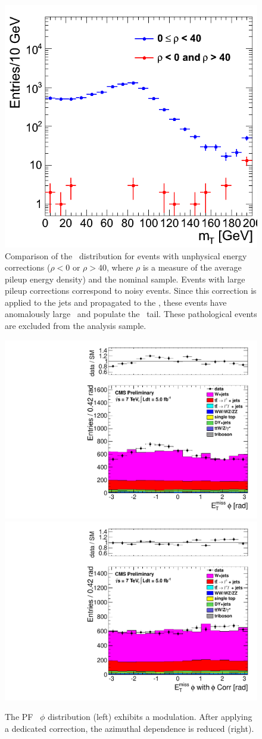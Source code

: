 \begin{figure}[tbh]
  \begin{center}
	\includegraphics[width=0.5\linewidth]{plots/mt_rho_comp.png}
	\caption{ \label{fig:mtrhocomp}%
	  Comparison of the \mt\ distribution for events with
          unphysical energy corrections ($\rho <0$ or $ \rho > 40$, where $\rho$ is a
          measure of the average pileup energy density) and the
          nominal sample. Events with large pileup corrections 
          correspond to noisy events. Since this correction is applied
          to the jets and propagated to the \met, these events have
          anomalously large \met\ and populate the \mt\ tail. These
          pathological events are excluded from the analysis sample.}
  \end{center}
\end{figure}

\begin{figure}[hb]
  \begin{center}
	\includegraphics[width=0.5\linewidth]{plots/metphi.pdf}%
	\includegraphics[width=0.5\linewidth]{plots/metphi_phicorr.pdf}
	\caption{ \label{fig:metphicomp}%
	  The PF \met\ $\phi$ distribution (left) exhibits a
          modulation. After applying a dedicated correction, the
          azimuthal dependence is reduced (right).}
  \end{center}
\end{figure}

